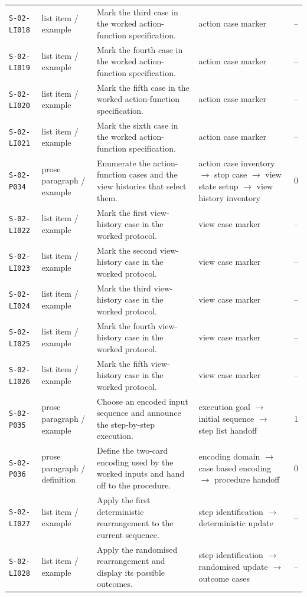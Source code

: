 \documentclass[10pt]{article}
\begin{document}
\begin{longtable}{@{}p{}p{}p{}p{}p{}@{}}
\texttt{S-02-LI018}&list item / example&Mark the third case in the worked action-function specification.&action case marker&--\\
\texttt{S-02-LI019}&list item / example&Mark the fourth case in the worked action-function specification.&action case marker&--\\
\texttt{S-02-LI020}&list item / example&Mark the fifth case in the worked action-function specification.&action case marker&--\\
\texttt{S-02-LI021}&list item / example&Mark the sixth case in the worked action-function specification.&action case marker&--\\
\texttt{S-02-P034}&prose paragraph / example&Enumerate the action-function cases and the view histories that select them.&action case inventory $\rightarrow$ stop case $\rightarrow$ view state setup $\rightarrow$ view history inventory&0\\
\texttt{S-02-LI022}&list item / example&Mark the first view-history case in the worked protocol.&view case marker&--\\
\texttt{S-02-LI023}&list item / example&Mark the second view-history case in the worked protocol.&view case marker&--\\
\texttt{S-02-LI024}&list item / example&Mark the third view-history case in the worked protocol.&view case marker&--\\
\texttt{S-02-LI025}&list item / example&Mark the fourth view-history case in the worked protocol.&view case marker&--\\
\texttt{S-02-LI026}&list item / example&Mark the fifth view-history case in the worked protocol.&view case marker&--\\
\texttt{S-02-P035}&prose paragraph / example&Choose an encoded input sequence and announce the step-by-step execution.&execution goal $\rightarrow$ initial sequence $\rightarrow$ step list handoff&1\\
\texttt{S-02-P036}&prose paragraph / definition&Define the two-card encoding used by the worked inputs and hand off to the procedure.&encoding domain $\rightarrow$ case based encoding $\rightarrow$ procedure handoff&0\\
\texttt{S-02-LI027}&list item / example&Apply the first deterministic rearrangement to the current sequence.&step identification $\rightarrow$ deterministic update&--\\
\texttt{S-02-LI028}&list item / example&Apply the randomised rearrangement and display its possible outcomes.&step identification $\rightarrow$ randomised update $\rightarrow$ outcome cases&--\\

\end{longtable}
\end{document}
